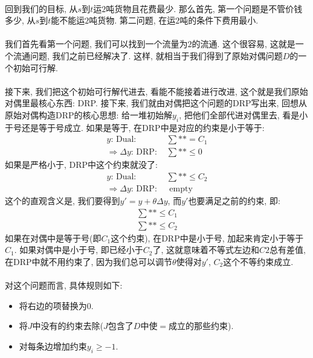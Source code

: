 \documentclass[a4paper]{article}
\begin{document}
        \paragraph{}回到我们的目标, 从$s$到$t$运$2$吨货物且花费最少. 那么首先, 第一个问题是不管价钱多少, 从$s$到$t$能不能运$2$吨货物. 第二问题, 在运$2$吨的条件下费用最小.
        \paragraph{}我们首先看第一个问题, 我们可以找到一个流量为$2$的流通. 这个很容易, 这就是一个流通问题, 我们之前已经解决了. 这样, 就相当于我们得到了原始对偶问题$D$的一个初始可行解.
        \paragraph{}接下来, 我们把这个初始可行解代进去, 看能不能接着进行改进, 这个就是我们原始对偶里最核心东西: DRP. 接下来, 我们就由对偶把这个问题的DRP写出来, 回想从原始对偶构造DRP的核心思想: 给一堆初始解$y_i$, 把他们全部代进对偶里去, 看是小于号还是等于号成立. 如果是等于, 在DRP中是对应的约束是小于等于:
        \begin{align*}
        y \text{: Dual: } & \sum ** = C_1 \\
        \Rightarrow \Delta y \text{: DRP: } & \sum ** \leq 0
        \end{align*}
如果是严格小于, DRP中这个约束就没了:
        \begin{align*}
        y \text{: Dual: } & \sum ** \leq C_2 \\
        \Rightarrow \Delta y \text{: DRP: } & \text{ empty}
        \end{align*}
这个的直观含义是, 我们要得到$y' = y + \theta \Delta y$, 而$y'$也要满足之前的约束, 即:
        \begin{align*}
            \sum ** \leq  C_1 \\
            \sum ** \leq  C_2
        \end{align*}
如果在对偶中是等于号(即$C_1$这个约束), 在DRP中是小于号, 加起来肯定小于等于$C_1$. 如果对偶中是小于号, 即已经小于$C_2$了, 这就意味着不等式左边和$C2$总有差值, 在DRP中就不用约束了, 因为我们总可以调节$\theta$使得对$y'$, $C_2$这个不等约束成立.
       \paragraph{}对这个问题而言, 具体规则如下: 
\begin{itemize}
 \item 将右边的项替换为$0$.
 \item 将$J$中没有的约束去除($J$包含了$D$中使$=$成立的那些约束).
 \item 对每条边增加约束$y_{i}  \geq -1$.
\end{itemize}
\end{document}
